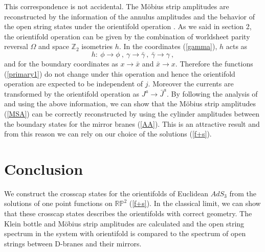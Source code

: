 \documentclass[a4paper,12pt]{article}
\newcommand{\bz}{\mathbb Z}
\newcommand{\brp}{{\mathbb R \mathbb P}^2}
\begin{document}
This correspondence is not accidental.
The M\"{o}bius strip amplitudes are reconstructed by the information of 
the annulus amplitudes and the behavior of the open string states under the
orientifold operation \cite{oplane3}.
As we said in section 2, the orientifold operation can be given by the
combination of worldsheet parity reversal $\Omega$ and space $\bz_2$
isometries $h$. 
In the coordinates (\ref{gamma}), $h$ acts as  
\begin{equation}
 h : ~ \phi \to \phi ~, ~ \gamma \to \bar{\gamma} ~,~ \bar{\gamma} \to \gamma
 ~,
\end{equation}
and for the boundary coordinates as $x \to \bar{x}$ and $\bar{x} \to x$.
Therefore the functions (\ref{primary1}) do not change under this
operation and hence the orientifold operation are expected to be
independent of $j$.  
Moreover the currents are transformed by the orientifold operation as
$J^a \to \bar{J}^a$. 
By following the analysis of \cite{oplane2} and using the above information, 
we can show that the M\"{o}bius strip amplitudes (\ref{MSA}) can be
correctly reconstructed by using the cylinder amplitudes between the
boundary states for the mirror branes (\ref{AA}). 
This is an attractive result and from this reason we can rely on our
choice of the solutions (\ref{f+s}).  



\section{Conclusion}
\indent

We construct the crosscap states for the orientifolds of Euclidean
$AdS_3$ from the solutions of one point functions on $\brp$ (\ref{f+s}).
In the classical limit, we can show that these crosscap states describes 
the orientifolds with correct geometry.  
The Klein bottle and M\"{o}bius strip amplitudes are calculated and the open
string spectrum in the system with orientifold is compared to the
spectrum of open strings between D-branes and their mirrors.
\end{document}
